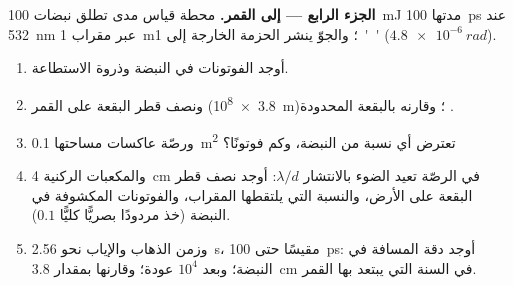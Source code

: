 \begin{problem}
\textbf{الجزء الرابع --- إلى القمر.}
محطة قياس مدى تطلق نبضات \qty{100}{mJ} مدتها \qty{100}{ps} عند
\qty{532}{nm} عبر مقراب \qty{1}{m}؛ والجوّ ينشر
الحزمة الخارجة إلى \qty{1}{''} ($\qty{4.8e-6}{rad}$).
\begin{enumerate}[resume]
  \item أوجد الفوتونات في النبضة وذروة الاستطاعة.
  \item ونصف قطر البقعة على القمر (\qty{3.8e8}{m})؛ وقارنه بالبقعة
        المحدودة .
  \item ورصّة عاكسات مساحتها \qty{0.1}{m^2} تعترض أي نسبة من
        النبضة، وكم فوتونًا؟
  \item والمكعبات الركنية \qty{4}{cm} في الرصّة تعيد الضوء
        بالانتشار $\lambda/d$: أوجد نصف قطر البقعة على الأرض، والنسبة التي يلتقطها
        المقراب، والفوتونات المكشوفة في النبضة (خذ مردودًا بصريًّا
        كليًّا $0.1$).
  \item وزمن الذهاب والإياب نحو \qty{2.56}{s}، مقيسًا حتى
        \qty{100}{ps}: أوجد دقة المسافة في النبضة؛ وبعد $10^4$
        عودة؛ وقارنها بمقدار \qty{3.8}{cm} في السنة التي يبتعد بها
        القمر.
\end{enumerate}
\end{problem}
